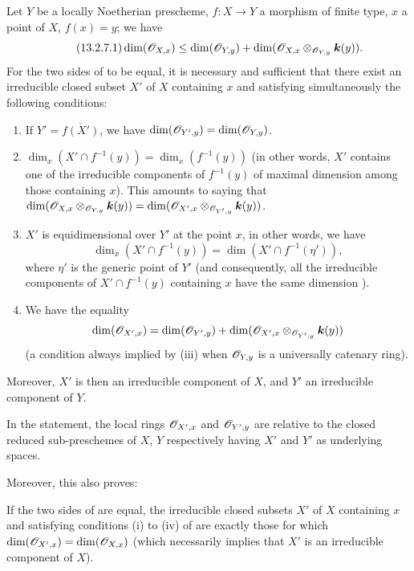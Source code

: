 \begin{proposition}[13.2.7]
\label{IV.13.2.7}
Let $Y$ be a locally Noetherian prescheme, $f:X\to Y$ a morphism of finite type, $x$ a point of $X$, $f(x)=y$; we have
\[
\tag{13.2.7.1}
\label{IV.13.2.7.1}
  \dim(\mathscr{O}_{X,x})\leq\dim(\mathscr{O}_{Y,y})+\dim(\mathscr{O}_{X,x}\otimes_{\mathscr{O}_{Y,y}}\boldsymbol{k}(y)).
\]
For the two sides of  to be equal, it is necessary and sufficient that there exist an irreducible closed subset $X'$ of $X$ containing $x$ and satisfying simultaneously the following conditions:
\begin{enumerate}[label=\textup{(\roman*)}]
  \item If $Y'=\overline{f(X')}$, we have $\dim(\mathscr{O}_{Y',y})=\dim(\mathscr{O}_{Y,y})$.
  \item $\dim_x(X'\cap f^{-1}(y))=\dim_x(f^{-1}(y))$ (in other words, $X'$ contains one of the irreducible components of $f^{-1}(y)$ of maximal dimension among those containing $x$). This amounts to saying that $\dim(\mathscr{O}_{X,x}\otimes_{\mathscr{O}_{Y,y}}\boldsymbol{k}(y))=\dim(\mathscr{O}_{X',x}\otimes_{\mathscr{O}_{Y',y}}\boldsymbol{k}(y))$.
  \item $X'$ is equidimensional over $Y'$ at the point $x$, in other words, we have
  \[
    \dim_x(X'\cap f^{-1}(y))=\dim(X'\cap f^{-1}(\eta')),
  \]
  where $\eta'$ is the generic point of $Y'$ (and consequently, all the irreducible components of $X'\cap f^{-1}(y)$ containing $x$ have the same dimension ).
  \item We have the equality
  \[
    \dim(\mathscr{O}_{X',x})=\dim(\mathscr{O}_{Y',y})+\dim(\mathscr{O}_{X',x}\otimes_{\mathscr{O}_{Y',y}}\boldsymbol{k}(y))
  \]
  (a condition always implied by \textup{(iii)} when $\mathscr{O}_{Y,y}$ is a universally catenary ring).
\end{enumerate}
Moreover, $X'$ is then an irreducible component of $X$, and $Y'$ an irreducible component of $Y$.
\end{proposition}

In the statement, the local rings $\mathscr{O}_{X',x}$ and $\mathscr{O}_{Y',y}$ are relative to the closed reduced sub-preschemes of $X$, $Y$ respectively having $X'$ and $Y'$ as underlying spaces.

Moreover, this also proves:

\begin{corollary}[13.2.8]
\label{IV.13.2.8}
If the two sides of  are equal, the irreducible closed subsets $X'$ of $X$ containing $x$ and satisfying conditions \textup{(i)} to \textup{(iv)} of  are exactly those for which $\dim(\mathscr{O}_{X',x})=\dim(\mathscr{O}_{X,x})$ (which necessarily implies that $X'$ is an irreducible component of $X$).
\end{corollary}

